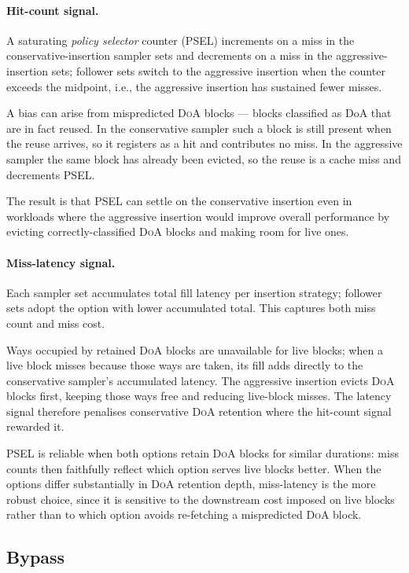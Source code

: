 \documentclass[conference]{IEEEtran}
\newcommand{\doa}{\textsc{DoA}\xspace}
\begin{document}
\paragraph{Hit-count signal.}
A saturating \emph{policy selector} counter (\textsc{PSEL}) increments on a
miss in the conservative-insertion sampler sets and decrements on a miss in the
aggressive-insertion sets; follower sets switch to the aggressive insertion when
the counter exceeds the midpoint, i.e., the aggressive insertion has sustained fewer misses.

A bias can arise from mispredicted \doa blocks --- blocks classified as DoA 
that are in fact reused. In the conservative sampler such a block is still 
present when the reuse arrives, so it registers as a hit and contributes no miss.
In the aggressive sampler the same block has already been evicted, so the
reuse is a cache miss and decrements \textsc{PSEL}.

The result is that \textsc{PSEL} can settle on the conservative insertion even
in workloads where the aggressive insertion would improve overall performance
by evicting correctly-classified \doa blocks and making room for live ones.

\paragraph{Miss-latency signal.}
Each sampler set accumulates total fill latency per insertion strategy; follower
sets adopt the option with lower accumulated total. This captures both miss count 
and miss cost.

Ways occupied by retained \doa blocks are unavailable for live blocks; when a
live block misses because those ways are taken, its fill adds directly to the
conservative sampler's accumulated latency.
The aggressive insertion evicts \doa blocks first, keeping those ways free and
reducing live-block misses.
The latency signal therefore penalises conservative \doa retention where the
hit-count signal rewarded it.

\textsc{PSEL} is reliable when both options retain \doa blocks for similar
durations: miss counts then faithfully reflect which option serves live blocks
better.
When the options differ substantially in \doa retention depth, miss-latency is
the more robust choice, since it is sensitive to the downstream cost imposed on
live blocks rather than to which option avoids re-fetching a mispredicted \doa
block.

\subsection{Bypass}
\label{sec:bypassstate_policy}
\end{document}
